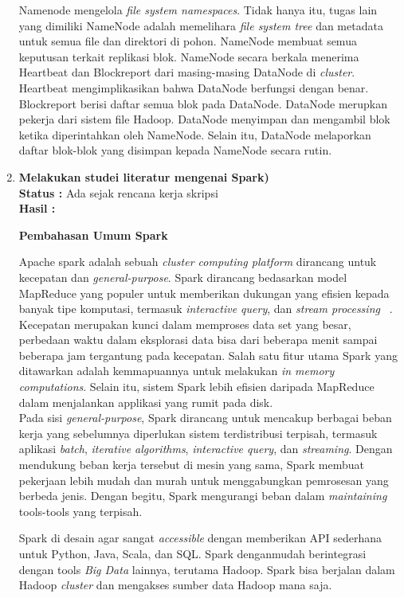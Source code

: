 \documentclass[a4paper,twoside]{article}
\begin{document}
\begin{enumerate}
Namenode mengelola \textit{file system namespaces}. Tidak hanya itu, tugas lain yang dimiliki NameNode adalah memelihara \textit{file system tree} dan metadata untuk semua file dan direktori di pohon. NameNode membuat semua keputusan terkait replikasi blok. NameNode secara berkala menerima Heartbeat dan Blockreport dari masing-masing DataNode di {\it cluster}. Heartbeat mengimplikasikan bahwa DataNode berfungsi dengan benar. Blockreport berisi daftar semua blok pada DataNode. DataNode merupkan pekerja dari sistem file Hadoop. DataNode menyimpan dan mengambil blok ketika diperintahkan oleh NameNode. Selain itu, DataNode melaporkan daftar blok-blok yang disimpan kepada NameNode secara rutin.		
		
		
		\item \textbf{Melakukan studei literatur mengenai Spark)}\\
		{\bf Status :} Ada sejak rencana kerja skripsi \\
		{\bf Hasil :} 
		
\textbf{Pembahasan Umum Spark}

Apache spark adalah sebuah {\it cluster computing platform} dirancang untuk kecepatan dan {\it general-purpose}. Spark dirancang bedasarkan model MapReduce yang populer untuk memberikan dukungan yang efisien kepada banyak tipe komputasi, termasuk {\it interactive query}, dan {\it stream processing} ~\cite{holdenkarau:02:ls}. Kecepatan merupakan kunci dalam memproses data set yang besar, perbedaan waktu dalam eksplorasi data bisa dari beberapa menit sampai beberapa jam tergantung pada kecepatan. Salah satu fitur utama Spark yang ditawarkan adalah kemmapuannya untuk melakukan {\it in memory computations}. Selain itu, sistem Spark lebih efisien daripada MapReduce dalam menjalankan applikasi yang rumit pada disk.\\


Pada sisi {\it general-purpose}, Spark dirancang untuk mencakup berbagai beban kerja yang sebelumnya diperlukan sistem terdistribusi terpisah, termasuk aplikasi \textit{batch}, {\it iterative algorithms}, {\it interactive query}, dan \textit{streaming}. Dengan mendukung beban kerja tersebut di mesin yang sama, Spark membuat pekerjaan lebih mudah dan murah untuk menggabungkan pemrosesan yang berbeda jenis. Dengan begitu, Spark mengurangi beban dalam {\it maintaining} tools-tools yang terpisah.

Spark di desain agar sangat {\it accessible} dengan memberikan API sederhana untuk Python, Java, Scala, dan SQL. Spark denganmudah berintegrasi dengan tools {\it Big Data} lainnya, terutama Hadoop. Spark bisa berjalan dalam Hadoop {\it cluster} dan mengakses sumber data Hadoop mana saja.



\end{enumerate}
\end{document}

